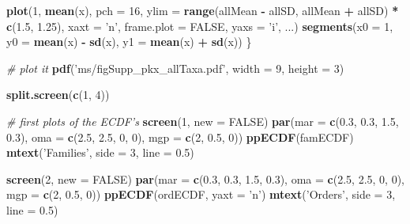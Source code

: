 \documentclass[]{article}
\newenvironment{Shaded}{\begin{snugshade}}{\end{snugshade}}
\newcommand{\KeywordTok}[1]{\textcolor[rgb]{0.13,0.29,0.53}{\textbf{#1}}}
\newcommand{\DataTypeTok}[1]{\textcolor[rgb]{0.13,0.29,0.53}{#1}}
\newcommand{\DecValTok}[1]{\textcolor[rgb]{0.00,0.00,0.81}{#1}}
\newcommand{\FloatTok}[1]{\textcolor[rgb]{0.00,0.00,0.81}{#1}}
\newcommand{\StringTok}[1]{\textcolor[rgb]{0.31,0.60,0.02}{#1}}
\newcommand{\CommentTok}[1]{\textcolor[rgb]{0.56,0.35,0.01}{\textit{#1}}}
\newcommand{\OtherTok}[1]{\textcolor[rgb]{0.56,0.35,0.01}{#1}}
\newcommand{\OperatorTok}[1]{\textcolor[rgb]{0.81,0.36,0.00}{\textbf{#1}}}
\newcommand{\NormalTok}[1]{#1}
\begin{document}
\begin{Shaded}
\begin{Highlighting}[]
    \KeywordTok{plot}\NormalTok{(}\DecValTok{1}\NormalTok{, }\KeywordTok{mean}\NormalTok{(x), }\DataTypeTok{pch =} \DecValTok{16}\NormalTok{, }
         \DataTypeTok{ylim =} \KeywordTok{range}\NormalTok{(allMean }\OperatorTok{-}\StringTok{ }\NormalTok{allSD, allMean }\OperatorTok{+}\StringTok{ }\NormalTok{allSD) }\OperatorTok{*}\StringTok{ }\KeywordTok{c}\NormalTok{(}\FloatTok{1.5}\NormalTok{, }\FloatTok{1.25}\NormalTok{), }
         \DataTypeTok{xaxt =} \StringTok{'n'}\NormalTok{, }\DataTypeTok{frame.plot =} \OtherTok{FALSE}\NormalTok{, }\DataTypeTok{yaxs =} \StringTok{'i'}\NormalTok{, }
\NormalTok{         ...)}
    \KeywordTok{segments}\NormalTok{(}\DataTypeTok{x0 =} \DecValTok{1}\NormalTok{, }\DataTypeTok{y0 =} \KeywordTok{mean}\NormalTok{(x) }\OperatorTok{-}\StringTok{ }\KeywordTok{sd}\NormalTok{(x), }\DataTypeTok{y1 =} \KeywordTok{mean}\NormalTok{(x) }\OperatorTok{+}\StringTok{ }\KeywordTok{sd}\NormalTok{(x))}
\NormalTok{\}}




\CommentTok{# plot it}
\KeywordTok{pdf}\NormalTok{(}\StringTok{'ms/figSupp_pkx_allTaxa.pdf'}\NormalTok{, }\DataTypeTok{width =} \DecValTok{9}\NormalTok{, }\DataTypeTok{height =} \DecValTok{3}\NormalTok{)}

\KeywordTok{split.screen}\NormalTok{(}\KeywordTok{c}\NormalTok{(}\DecValTok{1}\NormalTok{, }\DecValTok{4}\NormalTok{))}

\CommentTok{# first plots of the ECDF's}
\KeywordTok{screen}\NormalTok{(}\DecValTok{1}\NormalTok{, }\DataTypeTok{new =} \OtherTok{FALSE}\NormalTok{)}
\KeywordTok{par}\NormalTok{(}\DataTypeTok{mar =} \KeywordTok{c}\NormalTok{(}\FloatTok{0.3}\NormalTok{, }\FloatTok{0.3}\NormalTok{, }\FloatTok{1.5}\NormalTok{, }\FloatTok{0.3}\NormalTok{), }\DataTypeTok{oma =} \KeywordTok{c}\NormalTok{(}\FloatTok{2.5}\NormalTok{, }\FloatTok{2.5}\NormalTok{, }\DecValTok{0}\NormalTok{, }\DecValTok{0}\NormalTok{), }
    \DataTypeTok{mgp =} \KeywordTok{c}\NormalTok{(}\DecValTok{2}\NormalTok{, }\FloatTok{0.5}\NormalTok{, }\DecValTok{0}\NormalTok{))}
\KeywordTok{ppECDF}\NormalTok{(famECDF)}
\KeywordTok{mtext}\NormalTok{(}\StringTok{'Families'}\NormalTok{, }\DataTypeTok{side =} \DecValTok{3}\NormalTok{, }\DataTypeTok{line =} \FloatTok{0.5}\NormalTok{)}

\KeywordTok{screen}\NormalTok{(}\DecValTok{2}\NormalTok{, }\DataTypeTok{new =} \OtherTok{FALSE}\NormalTok{)}
\KeywordTok{par}\NormalTok{(}\DataTypeTok{mar =} \KeywordTok{c}\NormalTok{(}\FloatTok{0.3}\NormalTok{, }\FloatTok{0.3}\NormalTok{, }\FloatTok{1.5}\NormalTok{, }\FloatTok{0.3}\NormalTok{), }\DataTypeTok{oma =} \KeywordTok{c}\NormalTok{(}\FloatTok{2.5}\NormalTok{, }\FloatTok{2.5}\NormalTok{, }\DecValTok{0}\NormalTok{, }\DecValTok{0}\NormalTok{), }
    \DataTypeTok{mgp =} \KeywordTok{c}\NormalTok{(}\DecValTok{2}\NormalTok{, }\FloatTok{0.5}\NormalTok{, }\DecValTok{0}\NormalTok{))}
\KeywordTok{ppECDF}\NormalTok{(ordECDF, }\DataTypeTok{yaxt =} \StringTok{'n'}\NormalTok{)}
\KeywordTok{mtext}\NormalTok{(}\StringTok{'Orders'}\NormalTok{, }\DataTypeTok{side =} \DecValTok{3}\NormalTok{, }\DataTypeTok{line =} \FloatTok{0.5}\NormalTok{)}


\end{Highlighting}
\end{Shaded}
\end{document}
